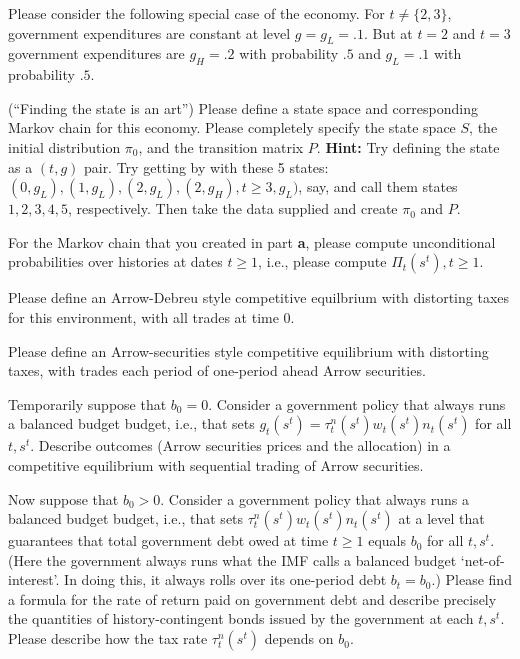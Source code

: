 \medskip

\noindent Please consider the following special case of the economy.  For $t \neq \{2,3\}$, government expenditures are constant at
level $g=g_L = .1$.  But at $t=2$ and $t=3$ government expenditures are $g_H = .2 $ with probability $.5$ and  $g_L=.1$ with probability $.5$.


\medskip
{} (``Finding the state is an art'')  \quad Please define a state space and corresponding
 Markov chain for this economy.  Please  completely specify the state
space $S$, the initial distribution $\pi_0$, and the transition matrix $P$.  {\bf Hint:}  Try defining the state as a $(t, g)$ pair.
Try getting by with these   5 states:\hfil\break
$(0, g_L), (1, g_L), (2, g_L), (2, g_H),t \geq 3, g_L)$, say, and call them states $1, 2, 3, 4, 5$, respectively.  Then
take the data supplied and create $\pi_0$ and $P$.

\medskip
{} For the Markov chain that you created in part {\bf a}, please compute unconditional probabilities over  histories  at dates $t \geq 1$,
i.e., please compute $\Pi_t(s^t), t \geq 1$.

\medskip
{} Please define an Arrow-Debreu style competitive equilbrium with distorting taxes for this environment, with all trades at time $0$.

\medskip
{} Please define an  Arrow-securities style competitive equilibrium with distorting taxes, with trades each period of one-period ahead
Arrow securities.

\medskip
{}  Temporarily suppose that $b_0 = 0$.  Consider a government policy that always runs a balanced budget budget, i.e.,
that  sets $g_t(s^t) = \tau_t^n(s^t) w_t(s^t) n_t(s^t)$ for all $t, s^t$.  Describe  outcomes (Arrow securities prices and the allocation) in a competitive
equilibrium with sequential trading of Arrow securities.

\medskip
{}  Now suppose that $b_0 >0$.  Consider a government policy that always runs a balanced budget budget, i.e.,
that  sets $\tau_t^n(s^t) w_t(s^t) n_t(s^t)$ at a level that guarantees that total government debt owed at time $t\geq 1$ equals $b_0$ for all $t, s^t$.  (Here the
government always runs what the IMF calls a  balanced budget `net-of-interest'.  In doing this, it always rolls over its one-period debt $b_t = b_0$.)
Please find a formula for the rate of return paid on government debt
and describe precisely the quantities of  history-contingent bonds issued by the government at each $t, s^t$.  Please describe how the tax rate
$\tau_t^n(s^t)$ depends on $b_0$.

